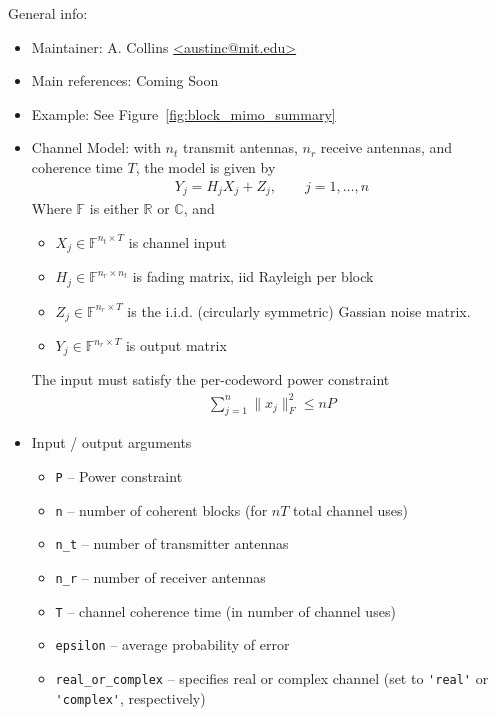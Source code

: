 \documentclass[a4paper,11p]{memoir}
\begin{document}
General info:
\begin{itemize}
\item Maintainer: A. Collins \url{<austinc@mit.edu>}

\item Main references: Coming Soon

\item Example: See Figure~\ref{fig:block_mimo_summary}

\item Channel Model: with $n_t$ transmit antennas, $n_r$ receive antennas, and coherence time $T$, the model is given by
\begin{align*}
Y_j = H_jX_j + Z_j, \qquad j = 1,\hdots,n
\end{align*}
Where $\mathbb{F}$ is either $\mathbb{R}$ or $\mathbb{C}$, and
\begin{itemize}
\item $X_j \in \mathbb{F}^{n_t \times T}$ is channel input
\item $H_j \in \mathbb{F}^{n_r \times n_t}$ is fading matrix, iid Rayleigh per block
\item $Z_j \in \mathbb{F}^{n_r \times T}$ is the i.i.d. (circularly symmetric) Gassian noise matrix.
\item $Y_j \in \mathbb{F}^{n_r \times T}$ is output matrix
\end{itemize}
The input must satisfy the per-codeword power constraint
\begin{align*}
\sum_{j=1}^n \|x_j\|_F^2 \leq nP
\end{align*}

\item Input / output arguments
\begin{itemize}
\item \verb|P| -- Power constraint
\item \verb|n| -- number of coherent blocks (for $nT$ total channel uses)
\item \verb|n_t| -- number of transmitter antennas
\item \verb|n_r| -- number of receiver antennas
\item \verb|T| -- channel coherence time (in number of channel uses)
\item \verb|epsilon| -- average probability of error
\item \verb|real_or_complex| -- specifies real or complex channel (set to \verb|'real'| or \verb|'complex'|, respectively)
\end{itemize}
\end{itemize}
\end{document}
